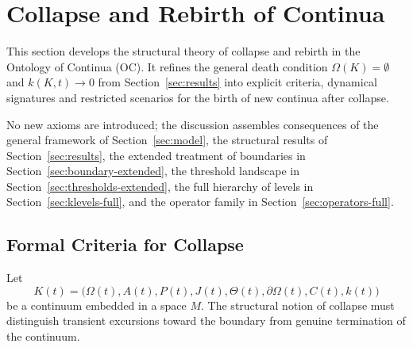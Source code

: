 
\section{Collapse and Rebirth of Continua}
\label{sec:collapse-rebirth}

This section develops the structural theory of collapse and rebirth in the
Ontology of Continua (OC). It refines the general death condition
\(\Omega(K)=\emptyset\) and \(k(K,t)\to 0\) from
Section~\ref{sec:results} into explicit criteria, dynamical signatures and
restricted scenarios for the birth of new continua after collapse.

No new axioms are introduced; the discussion assembles consequences of the
general framework of Section~\ref{sec:model}, the structural results of
Section~\ref{sec:results}, the extended treatment of boundaries in
Section~\ref{sec:boundary-extended}, the threshold landscape in
Section~\ref{sec:thresholds-extended}, the full hierarchy of levels in
Section~\ref{sec:klevels-full}, and the operator family in
Section~\ref{sec:operators-full}.

\subsection{Formal Criteria for Collapse}

Let
\[
  K(t) =
  \big(
    \Omega(t), A(t), P(t), J(t),
    \Theta(t), \partial\Omega(t), C(t), k(t)
  \big)
\]
be a continuum embedded in a space \(M\). The structural notion of collapse
must distinguish transient excursions toward the boundary from genuine
termination of the continuum.

